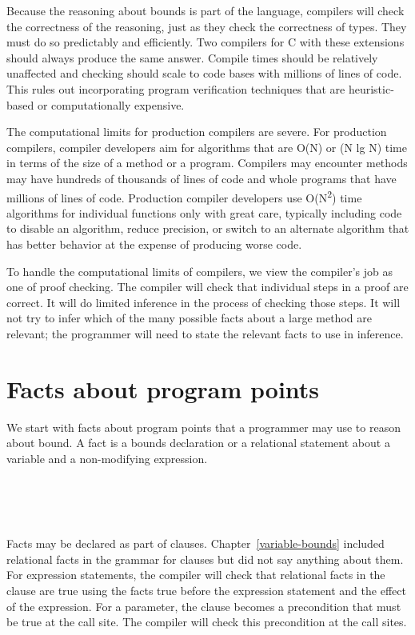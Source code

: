 Because the reasoning about bounds is part of the language, compilers
will check the correctness of the reasoning, just as they check the
correctness of types. They must do so predictably and efficiently. Two
compilers for C with these extensions should always produce the same
answer. Compile times should be relatively unaffected and checking
should scale to code bases with millions of lines of code. This rules
out incorporating program verification techniques that are
heuristic-based or computationally expensive.

The computational limits for production compilers are severe. For
production compilers, compiler developers aim for algorithms that are
O(N) or (N lg N) time in terms of the size of a method or a program.
Compilers may encounter methods may have hundreds of thousands of lines
of code and whole programs that have millions of lines of code.
Production compiler developers use O(N\textsuperscript{2}) time
algorithms for individual functions only with great care, typically
including code to disable an algorithm, reduce precision, or switch to
an alternate algorithm that has better behavior at the expense of
producing worse code.

To handle the computational limits of compilers, we view the compiler's
job as one of proof checking. The compiler will check that individual
steps in a proof are correct. It will do limited inference in the
process of checking those steps. It will not try to infer which of the
many possible facts about a large method are relevant; the programmer
will need to state the relevant facts to use in inference.

\section{Facts about program points}

We start with facts about program points that a programmer may use to
reason about bound.  A  fact is a bounds declaration or a relational
statement about a variable and a non-modifying expression.
\begin{tabbing}
\=\\
\> \\
\> \\
\>
\end{tabbing}

Facts may be declared as part of  clauses.  
Chapter~\ref{variable-bounds} included relational facts in
the grammar for  clauses but did not say
anything about them.  For expression statements, the compiler
will check that relational facts in the  clause are true 
using the facts true before the expression statement and the effect of
the expression. For a parameter, the  clause becomes a 
precondition that must be true at the call site. The compiler will check this precondition at the call sites. 

